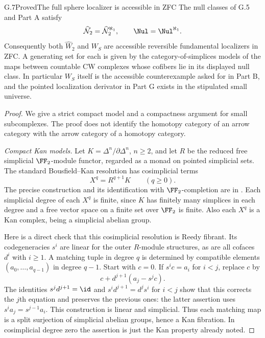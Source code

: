 \begin{claim}{G.7}{Proved}{The full sphere localizer is accessible in ZFC}
The null classes of G.5 and Part A satisfy
\[
 \widehat{\mathcal N}_2
       =\widehat{\mathcal N}_2^{\aleph_1},
 \qquad \Nul=\Nul^{\aleph_1}.
\]
Consequently both $\widehat W_2$ and $W_S$ are accessible reversible fundamental localizers in ZFC. A generating set for each is given by the category-of-simplices models of the maps between countable CW complexes whose cofibers lie in its displayed null class. In particular $W_S$ itself is the accessible counterexample asked for in Part B, and the pointed localization derivator in Part G exists in the stipulated small universe.
\end{claim}
\begin{proof}
We give a strict compact model and a compactness argument for small subcomplexes. The proof does not identify the homotopy category of an arrow category with the arrow category of a homotopy category.

\emph{Compact Kan models.}
Let $K=\Delta^n/\partial\Delta^n$, $n\geq2$, and let $R$ be the reduced free simplicial $\FF_2$-module functor, regarded as a monad on pointed simplicial sets. The standard Bousfield--Kan resolution has cosimplicial terms
\[
 X^q=R^{q+1}K\qquad(q\geq0).
\]
The precise construction and its identification with $\FF_2$-completion are in \cite[\S7.7, pp.~1032--1033]{FGHBousfield2003}. Each simplicial degree of each $X^q$ is finite, since $K$ has finitely many simplices in each degree and a free vector space on a finite set over $\FF_2$ is finite. Also each $X^q$ is a Kan complex, being a simplicial abelian group.

Here is a direct check that this cosimplicial resolution is Reedy fibrant. Its codegeneracies $s^i$ are linear for the outer $R$-module structures, as are all cofaces $d^i$ with $i\geq1$. A matching tuple in degree $q$ is determined by compatible elements $(a_0,\ldots,a_{q-1})$ in degree $q-1$. Start with $c=0$. If $s^ic=a_i$ for $i<j$, replace $c$ by
\[
 c+d^{j+1}(a_j-s^jc).
\]
The identities $s^jd^{j+1}=\id$ and $s^id^{j+1}=d^js^i$ for $i<j$ show that this corrects the $j$th equation and preserves the previous ones: the latter assertion uses $s^i a_j=s^{j-1}a_i$. This construction is linear and simplicial. Thus each matching map is a split surjection of simplicial abelian groups, hence a Kan fibration. In cosimplicial degree zero the assertion is just the Kan property already noted.


\end{proof}
